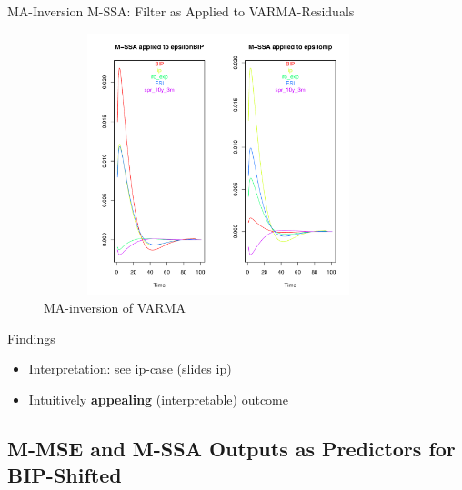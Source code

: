 \documentclass{beamer}
\begin{document}
\begin{frame} {MA-Inversion M-SSA: Filter as Applied to VARMA-Residuals}
\begin{figure}[H]\begin{center}\includegraphics[height=3in, width=4in]{MSSA_multi_eps_ip.pdf}\caption{MA-inversion of VARMA\label{cor}}\end{center}\end{figure}\end{frame}



\begin{frame} {Findings}
\begin{itemize}
\item Interpretation: see ip-case (slides ip)
\item Intuitively \textbf{appealing} (interpretable) outcome
\end{itemize}
\end{frame}


\subsection{M-MSE and M-SSA Outputs as Predictors for BIP-Shifted}
\end{document}
